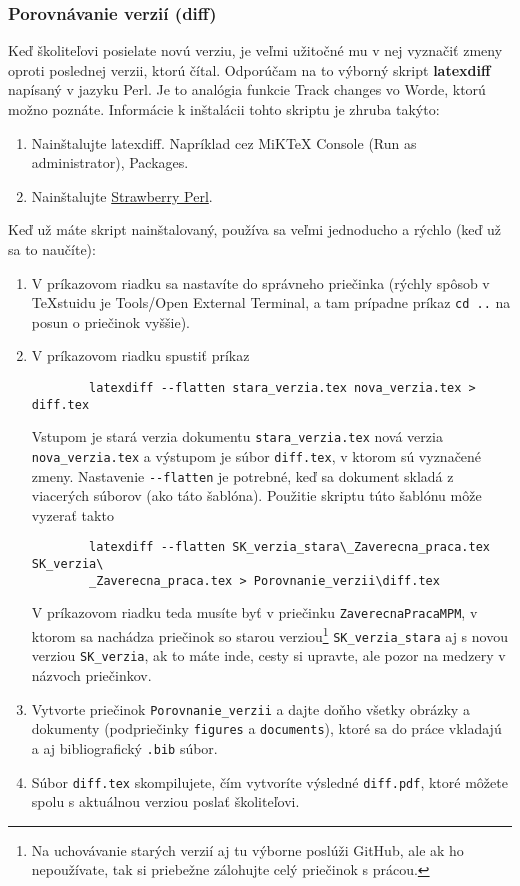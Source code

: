 \subsubsection{Porovnávanie verzií (diff)}
Keď školiteľovi posielate novú verziu, je veľmi užitočné mu v nej vyznačiť zmeny oproti poslednej verzii, ktorú čítal. Odporúčam na to výborný skript \textbf{latexdiff} napísaný v jazyku Perl. Je to analógia funkcie Track changes vo Worde, ktorú možno poznáte. Informácie k inštalácii tohto skriptu je zhruba takýto:
\begin{enumerate}
	\item Nainštalujte latexdiff. Napríklad cez MiKTeX Console (Run as administrator), Packages.
	\item Nainštalujte \href{https://strawberryperl.com/}{Strawberry Perl}.
\end{enumerate}
Keď už máte skript nainštalovaný, používa sa veľmi jednoducho a rýchlo (keď už sa to naučíte):
\begin{enumerate}
	\item V príkazovom riadku sa nastavíte do správneho priečinka (rýchly spôsob v TeXstuidu je Tools/Open External Terminal, a tam prípadne príkaz \verb|cd ..| na posun o priečinok vyššie).
	\item V príkazovom riadku spustiť príkaz
	\begin{verbatim}
		latexdiff --flatten stara_verzia.tex nova_verzia.tex > diff.tex
	\end{verbatim}
	Vstupom je stará verzia dokumentu \verb|stara_verzia.tex| nová verzia \verb|nova_verzia.tex| a výstupom je súbor \verb|diff.tex|, v ktorom sú vyznačené zmeny. Nastavenie \verb|--flatten| je potrebné, keď sa dokument skladá z viacerých súborov (ako táto šablóna). Použitie skriptu túto šablónu môže vyzerať takto
	\begin{verbatim}
		latexdiff --flatten SK_verzia_stara\_Zaverecna_praca.tex SK_verzia\
		_Zaverecna_praca.tex > Porovnanie_verzii\diff.tex
	\end{verbatim}
	V príkazovom riadku teda musíte byť v priečinku \verb|ZaverecnaPracaMPM|, v ktorom sa nachádza priečinok so starou verziou\footnote{Na uchovávanie starých verzií aj tu výborne poslúži GitHub, ale ak ho nepoužívate, tak si priebežne zálohujte celý priečinok s prácou.} \verb|SK_verzia_stara| aj s novou verziou \verb|SK_verzia|, ak to máte inde, cesty si upravte, ale pozor na medzery v názvoch priečinkov.
	\item Vytvorte priečinok \verb|Porovnanie_verzii| a dajte doňho všetky obrázky a dokumenty (podpriečinky \verb|figures| a \verb|documents|), ktoré sa do práce vkladajú a aj bibliografický \verb|.bib| súbor.
	\item Súbor \verb|diff.tex| skompilujete, čím vytvoríte výsledné \verb|diff.pdf|, ktoré môžete spolu s aktuálnou verziou poslať školiteľovi.
\end{enumerate}







